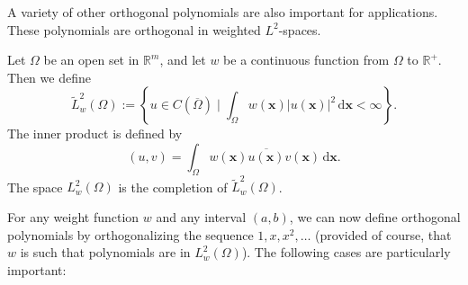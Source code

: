 A variety of other orthogonal polynomials are also important for applications. These polynomials are orthogonal in weighted $L^2$-spaces.

\begin{Definition}
\label{def:weighted-lp-two-space}
Let $\Omega$ be an open set in $\mathbb{R}^m$, and let $w$ be a continuous function from $\Omega$ to $\mathbb{R}^+$. Then we define
\begin{equation}\label{eq:weighted-continuous-lp-two-space}
\widetilde L_w^2(\Omega):=\left\{u\in C(\overline\Omega)\mid\int_\Omega w(\bm{x})|u(\bm{x})|^2\,\mathrm{d}\bm{x}<\infty\right\}.
\end{equation}
The inner product is defined by
\begin{equation}\label{eq:weighted-lp-two-inner-product}
(u,v)=\int_\Omega w(\bm{x})\overline{u(\bm{x})}v(\bm{x})\,\mathrm{d}\bm{x}.
\end{equation}
The space $L_w^2(\Omega)$ is the completion of $\widetilde L_w^2(\Omega)$.
\end{Definition}

For any weight function $w$ and any interval $(a,b)$, we can now define orthogonal polynomials by orthogonalizing the sequence $1,x,x^2,\ldots$ (provided of course, that $w$ is such that polynomials are in $L_w^2(\Omega)$). The following cases are particularly important:
